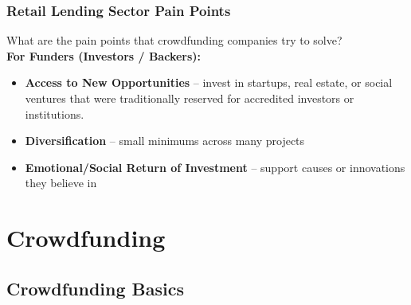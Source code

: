 \documentclass[aspectratio=169,xcolor=dvipsnames]{beamer}
\begin{document}
\begin{frame}
\frametitle{Retail Lending Sector Pain Points}


What are the pain points that crowdfunding companies try to solve? \\
\smallskip 
\textbf{For Funders (Investors / Backers):}
\begin{itemize}
    \item \textbf{Access to New Opportunities} -- invest in startups, real estate, or social ventures that were traditionally reserved for accredited investors or institutions.
    \item \textbf{Diversification} -- small minimums across many projects
    \item \textbf{Emotional/Social Return of Investment} -- support causes or innovations they believe in
\end{itemize}


	
\end{frame} 




\section{Crowdfunding}




\subsection{Crowdfunding Basics}
\end{document}
